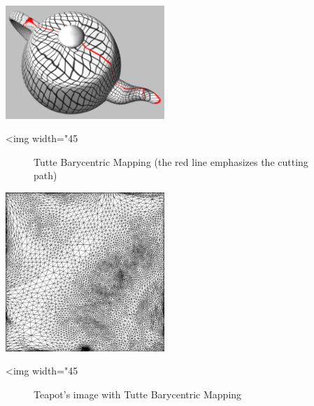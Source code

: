 \begin{center}
    \label{Surface_mesh_parameterization-fig-uniform}
    \begin{ccTexOnly}
        \includegraphics[width=0.45\textwidth]{Surface_mesh_parameterization/uniform}
    \end{ccTexOnly}
    \begin{ccHtmlOnly}
        <img width="45%
    \end{ccHtmlOnly}
    \begin{figure}[h]
        \caption{Tutte Barycentric Mapping (the red line emphasizes the cutting path)}
    \end{figure}
\end{center}

\begin{center}
    \label{Surface_mesh_parameterization-fig-uniform_2}
    \begin{ccTexOnly}
        \includegraphics[width=0.45\textwidth]{Surface_mesh_parameterization/uniform_2}
    \end{ccTexOnly}
    \begin{ccHtmlOnly}
        <img width="45%
    \end{ccHtmlOnly}
    \begin{figure}[h]
        \caption{Teapot's image with Tutte Barycentric Mapping}
    \end{figure}
\end{center}


